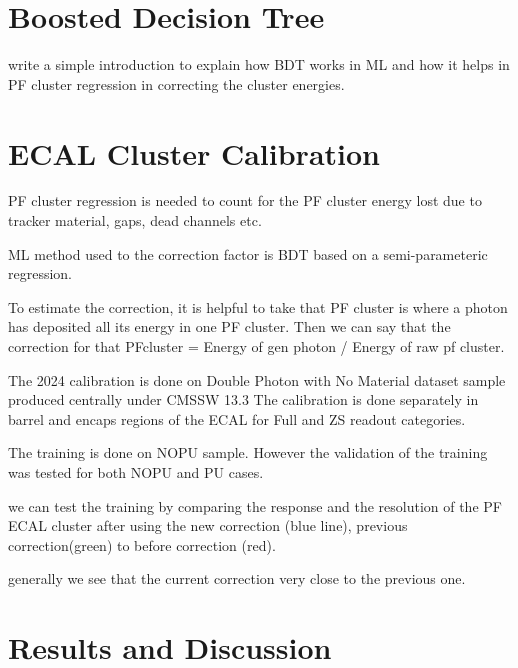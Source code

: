 
\section{Boosted Decision Tree}
write a simple introduction to explain how BDT works in ML and how it helps in PF cluster regression in correcting the cluster energies. 
\section{ECAL Cluster Calibration}

PF cluster regression is needed to count for the PF cluster energy lost due to tracker material, gaps, dead channels etc.

ML method used to the correction factor is BDT based on a semi-parameteric regression.

To estimate the correction, it is helpful to take that PF cluster is where a photon has deposited all its energy in one PF cluster. Then we can say that the correction for that PFcluster = Energy of gen photon / Energy of raw pf cluster.

The 2024 calibration is done on Double Photon with No Material dataset sample produced centrally under CMSSW 13.3 %
The calibration is done separately in barrel and encaps regions of the ECAL for  Full and ZS readout categories.   

The training  is done on NOPU sample. However the validation of the training was tested for both NOPU and PU cases.





we can test the training by comparing the response and the resolution of the PF ECAL cluster after using the new correction (blue line), previous correction(green) to before correction (red).

generally we see that the current correction very close to the previous one.
\section{Results and Discussion}

